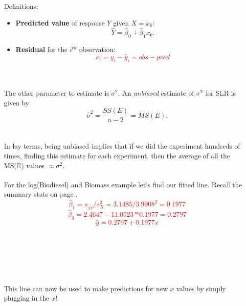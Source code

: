 \newpage

Definitions:
\begin{itemize}
\item \textbf{Predicted value} of response $Y$ given $X=x_0$: 
$$ \hat{Y}=\hat\beta_0 + \hat\beta_1 x_0.$$
\item \textbf{Residual} for the $i^{th}$ observation: 
\textcolor{red}{$$ e_i =y_i-\hat{y}_i = obs - pred$$~\\~\\}
\end{itemize}

The other parameter to estimate is $\sigma^2$.  An {\em unbiased} estimate of $\sigma^2$ for SLR is given by
$$\hat\sigma^2=\frac{SS(E)}{n-2}=MS(E).$$~\\~\\

In lay terms, being unbiased implies that if we did the experiment hundreds of times, finding this estimate for each experiment, then the average of all the MS(E) values $\approx\sigma^2$. \\~\\

For the log(Biodiesel) and Biomass example let`s find our fitted line.  Recall the summary stats on page \pageref{bio}.%
\textcolor{red}{
$$\hat\beta_1 = s_{_{XY}}/s_{X}^2 = 3.1485/3.9908^2 =  0.1977$$
$$\hat\beta_0 = 2.4647 - 11.0523*0.1977 = 0.2797$$
$$\hat{y} = 0.2797 + 0.1977x$$}~\\~\\~\\~\\~\\~\\

This line can now be used to make predictions for new $x$ values by simply plugging in the $x$!\\~\\

